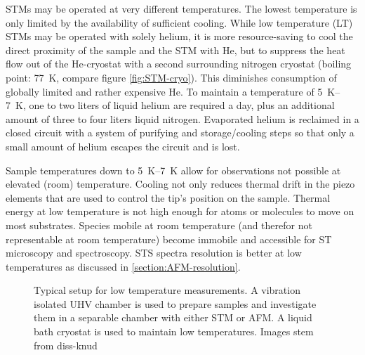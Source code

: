 STMs may be operated at very different temperatures. The lowest temperature is only limited by the availability of sufficient cooling. While low temperature (LT) STMs may be operated with solely helium, it is more resource-saving to cool the direct proximity of the sample and the STM with He, but to suppress the heat flow out of the He-cryostat with a second surrounding nitrogen cryostat (boiling point: \SI{77}{\K}, compare figure \ref{fig:STM-cryo}). This diminishes consumption of globally limited and rather expensive He. To maintain a temperature of \SIrange{5}{7}{\K}, one to two liters of liquid helium are required a day, plus an additional amount of three to four liters liquid nitrogen. Evaporated helium is reclaimed in a closed circuit with a system of purifying and storage/cooling steps so that only a small amount of helium escapes the circuit and is lost.

Sample temperatures down to \SIrange{5}{7}{\K} allow for observations not possible at elevated (room) temperature. Cooling not only reduces thermal drift in the piezo elements that are used to control the tip's position on the sample. Thermal energy at low temperature is not high enough for atoms or molecules to move on most substrates. Species mobile at room temperature (and therefor not representable at room temperature) become immobile and accessible for ST microscopy and spectroscopy. STS spectra resolution is better at low temperatures as discussed in \ref{section:AFM-resolution}.

\begin{figure}[ht]\centering
		 \quad
	\caption{Typical setup for low temperature measurements. A vibration isolated UHV chamber is used to prepare samples and investigate them in a separable chamber with either STM or AFM. A liquid bath cryostat is used to maintain low temperatures. Images stem from {diss-knud}}
	\label{fig:STM}
\end{figure}

